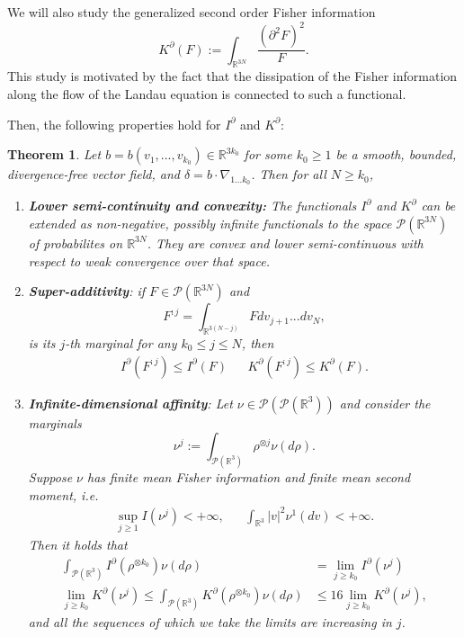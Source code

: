 \documentclass[11pt,a4paper]{article}
\theoremstyle{definition}
\theoremstyle{plain}
\newtheorem{theorem}[defi]{Theorem}
\begin{document}
We will also study the generalized second order Fisher information
$$K^\partial(F):=\int_{\mathbb{R}^{3N}} \frac{( \partial^2 F)^2}{F}.$$
This study is motivated by the fact that the dissipation of the Fisher information along the flow of the Landau equation is connected to such a functional.

Then, the following properties hold for $I^\partial$ and $K^\partial$:
\begin{theorem}
\label{thm:side}
Let $b=b(v_1,...,v_{k_0})\in\mathbb{R}^{3k_0}$ for some $k_0\geq 1$ be a smooth, bounded, divergence-free vector field, and $\delta=b\cdot\nabla_{1...k_0}$. Then for all $N\geq k_0$,
\begin{enumerate}
    \item \textbf{Lower semi-continuity and convexity:} The functionals $I^\partial$ and $K^\partial$ can be extended as non-negative, possibly infinite functionals to the space $\mathcal{P}(\mathbb{R}^{3N})$ of probabilites on $\mathbb{R}^{3N}$. They are convex and lower semi-continuous with respect to weak convergence over that space.
    \item \textbf{Super-additivity}: if $F\in\mathcal{P}(\mathbb{R}^{3N})$ and $$F^{:j}=\int_{\mathbb{R}^{3(N-j)}} F dv_{j+1}...dv_N,$$
    is its $j$-th marginal for any $k_0\leq j\leq N$, then 
    \begin{align*}
        I^\partial(F^{:j})\leq  I^\partial(F) && K^\partial(F^{:j})\leq  K^\partial(F).
    \end{align*}
    \item \textbf{Infinite-dimensional affinity}: Let $\nu\in\mathcal{P}(\mathcal{P}(\mathbb{R}^{3}))$ and consider the marginals
    $$\nu^j:=\int_{\mathcal{P}(\mathbb{R}^3)} \rho^{\otimes j} \nu(d\rho).$$
    Suppose $\nu$ has finite mean Fisher information and finite mean second moment, i.e.
    \begin{align*}
        \sup_{j\geq 1} I(\nu^j) < +\infty, &&\int_{\mathbb{R}^3} \vert v \vert^2 \nu^1(dv) < +\infty.
    \end{align*}
    Then it holds that
    \begin{align*}
        \int_{\mathcal{P}(\mathbb{R}^3)} I^\partial(\rho^{\otimes k_0}) \nu(d\rho) &=\lim_{j\geq k_0} I^\partial(\nu^j) \\\lim_{j\geq k_0} K^\partial(\nu^j)\leq \int_{\mathcal{P}(\mathbb{R}^3)} K^\partial(\rho^{\otimes k_0}) \nu(d\rho) &\leq 16 \lim_{j\geq k_0} K^\partial(\nu^j), 
    \end{align*}
    and all the sequences of which we take the limits are increasing in $j$.
\end{enumerate}
\end{theorem}
\end{document}
